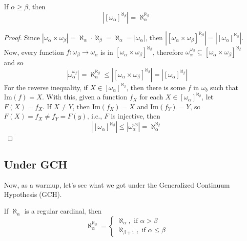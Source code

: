 \begin{lemma}{}{}\label{lemma_for_a>=b}
    If $\alpha\geq\beta$, then
    $$\left|[\omega_\alpha]^{\aleph_\beta}\right|=\aleph_\alpha^{\aleph_\beta}$$
\end{lemma}

\begin{proof}
    Since $|\omega_\alpha\times\omega_\beta|=\aleph_\alpha\cdot\aleph_\beta=\aleph_\alpha=|\omega_\alpha|$, then $\left|[\omega_\alpha\times\omega_\beta]^{\aleph_\beta}\right|=\left|[\omega_\alpha]^{\aleph_\beta}\right|$. Now, every function $f:\omega_\beta\to\omega_\alpha$ is in $[\omega_\alpha\times\omega_\beta]^{\aleph_\beta}$, therefore $\omega_\alpha^{\omega_\beta}\subseteq[\omega_\alpha\times\omega_\beta]^{\aleph_\beta}$ and so
    $$\left|\omega_\alpha^{\omega_\beta}\right|=\aleph_\alpha^{\aleph_\beta}\leq\left|[\omega_\alpha\times\omega_\beta]^{\aleph_\beta}\right|=\left|[\omega_\alpha]^{\aleph_\beta}\right|$$
    For the reverse inequality, if $X\in[\omega_\alpha]^{\aleph_\beta}$, then there is some $f$ in $\omega_b$ such that $\text{Im}(f)=X$. With this, given a function $f_X$ for each $X\in[\omega_\alpha]^{\aleph_\beta}$, let $F(X)=f_X$. If $X\neq Y$, then $\text{Im}(f_X)=X$ and $\text{Im}(f_Y)=Y$, so $F(X)=f_X\neq f_Y=F(y)$, i.e., $F$ is injective, then
    $$\left|[\omega_\alpha]^{\aleph_\beta}\right|\leq\left|\omega_\alpha^{\omega_\beta}\right|=\aleph_\alpha^{\aleph_\beta}$$
\end{proof}

\subsection{Under GCH}

Now, as a warmup, let's see what we got under the Generalized Continuum Hypothesis (GCH).

\begin{lemma}{}{}
    If $\aleph_\alpha$ is a regular cardinal, then
    $$\aleph_\alpha^{\aleph_\beta}=
    \begin{cases}
        \aleph_\alpha,\text{ if }\alpha>\beta\\
        \aleph_{\beta+1},\text{ if }\alpha\leq\beta
    \end{cases}
    $$
\end{lemma}

